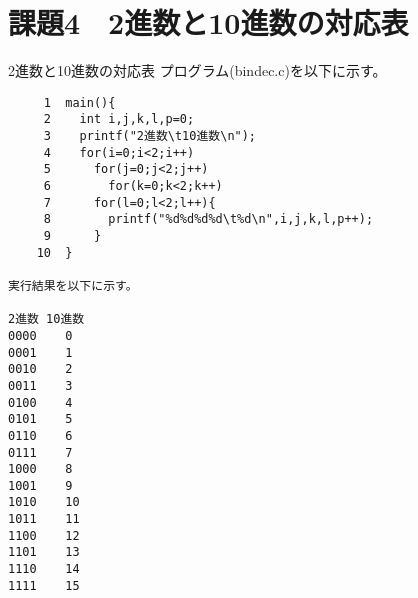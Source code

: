 \documentclass[11pt]{jarticle}
\begin{document}
\section{課題4　2進数と10進数の対応表}
2進数と10進数の対応表
プログラム(bindec.c)を以下に示す。
\begin{verbatim}
     1	main(){
     2	  int i,j,k,l,p=0;
     3	  printf("2進数\t10進数\n");
     4	  for(i=0;i<2;i++)
     5	    for(j=0;j<2;j++)
     6	      for(k=0;k<2;k++)
     7		for(l=0;l<2;l++){
     8		  printf("%d%d%d%d\t%d\n",i,j,k,l,p++);
     9		}
    10	}

実行結果を以下に示す。

2進数	10進数
0000	0
0001	1
0010	2
0011	3
0100	4
0101	5
0110	6
0111	7
1000	8
1001	9
1010	10
1011	11
1100	12
1101	13
1110	14
1111	15

\end{verbatim}
\end{document}
